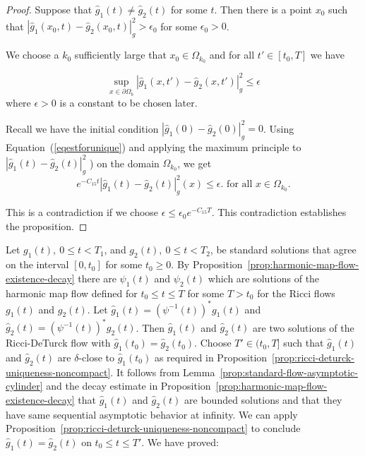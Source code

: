 \begin{proof}
Suppose that $\hat g_1\left(  t\right)  \neq  \hat g_2 \left(
t\right) $ for some $t$. Then there is a point $x_{0}$ such that
$\left\vert \hat g_1(x_0, t) - \hat g_2(x_0, t) \right\vert _{g}^{2}
>\epsilon_{0}$ for  some $\epsilon_{0}>0$.

We choose a $k_0$ sufficiently large that $x_{0}\in \Omega_{k_0}$
and for all $t'\in [t_0,T]$ we have

\begin{equation}
\sup_{x\in\partial\Omega_{b}}\left\vert \hat g_1(x,  t') -\hat
g_2(x, t') \right\vert _{g}^{2} \leq \epsilon \label{eq est for uniq
bddy}
\end{equation}
where $\epsilon >0$ is a constant to be chosen later.

Recall we have the initial condition $\left\vert \hat g_1( 0) -\hat
g_2(0)  \right\vert _{g}^{2}=0$. Using Equation~(\ref{eqestforunique}) and applying the maximum principle to $\left\vert \hat g_1(
t) -\hat g_2( t) \right\vert _{g}^{2}$ ) on the domain
$\Omega_{k_0}$, we get
\[
e^{-C_{15}t}\left\vert \hat g_1 (  t)  -\hat g_2 ( t) \right\vert
_{g}^{2}(  x) \leq\epsilon.\text{ for all }x\in\Omega _{k_0}.
\]

This is a contradiction if we choose $\epsilon \leq
\epsilon_{0}e^{-C_{15}T}$. This contradiction establishes the
proposition.
\end{proof}

 Let $g_1(t),\ 0\le t<T_1$, and $g_2(t),\ 0\le t<T_2$, be standard solutions that
 agree on the interval $[0,t_0]$ for some $t_0\ge 0$.
By Proposition~\ref{prop:harmonic-map-flow-existence-decay} there are $\psi_1(t)$  and
$\psi_2(t)$  which are solutions of the harmonic map flow defined
for $t_0 \leq t \leq T$ for some $T>t_0$ for the Ricci flows
$g_1(t)$ and $g_2(t)$. Let $\hat{g}_1(t)= (\psi^{-1}(t))^*g_1(t)$
and $\hat{g}_2(t) = (\psi^{-1}(t))^*g_2(t)$. Then $\hat{g}_1(t)$ and
$\hat{g}_2(t)$ are two solutions of the Ricci-DeTurck flow with
$\hat{g}_1(t_0)=\hat{g}_2(t_0)$. Choose $T' \in (t_0,T]$ such that
$\hat{g}_1(t)$ and $\hat{g}_2(t)$ are $\delta$-close to
$\hat{g}_1(t_0)$ as required in Proposition~\ref{prop:ricci-deturck-uniqueness-noncompact}. It follows
from Lemma~\ref{prop:standard-flow-asymptotic-cylinder} and the decay estimate in
Proposition~\ref{prop:harmonic-map-flow-existence-decay} that $\hat{g}_1(t)$ and $\hat{g}_2(t)$
are bounded solutions and that they have same sequential asymptotic
behavior at infinity. We can apply Proposition~\ref{prop:ricci-deturck-uniqueness-noncompact} to
conclude $\hat{g}_1(t)=\hat{g}_2(t)$ on $t_0 \leq t \leq T'$.  We
have proved:

